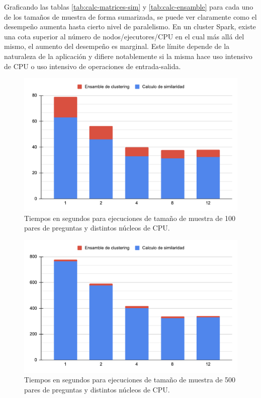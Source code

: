 Graficando las tablas \ref{tab:calc-matrices-sim} y \ref{tab:calc-ensamble} para cada uno de los tamaños de muestra de forma sumarizada, se puede ver claramente como el desempeño aumenta hasta cierto nivel de paralelismo. En un cluster Spark, existe una cota superior al número de nodos/ejecutores/CPU en el cual más allá del mismo, el aumento del desempeño es marginal. Este límite depende de la naturaleza de la aplicación y difiere notablemente si la misma hace uso intensivo de CPU o uso intensivo de operaciones de entrada-salida.

\begin{figure}
	\centering
	\includegraphics[width=0.7\linewidth]{10_resultados/imagenes/performance_100}
	\caption{Tiempos en segundos para ejecuciones de tamaño de muestra de 100 pares de preguntas y distintos núcleos de CPU.}
	\label{fig:performance100}
\end{figure}

\begin{figure}
	\centering
	\includegraphics[width=0.7\linewidth]{10_resultados/imagenes/performance_500}
	\caption{Tiempos en segundos para ejecuciones de tamaño de muestra de 500 pares de preguntas y distintos núcleos de CPU.}
	\label{fig:performance500}
\end{figure}

